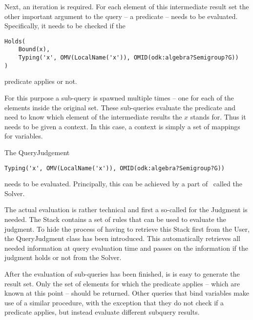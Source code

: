 Next, an iteration is required. 
For each element of this intermediate result set the other important argument to the query -- a predicate -- needs to be evaluated. 
Specifically, it needs to be checked if the \begin{lstlisting}[language=qmt]
Holds(
	Bound(x), 
	Typing('x', OMV(LocalName('x')), OMID(odk:algebra?Semigroup?G))
)
\end{lstlisting} predicate applies or not. 

For this purpose a sub-query is spawned multiple times -- one for each of the elements inside the original set. 
These sub-queries evaluate the predicate and need to know which element of the intermediate results the $x$ stands for. 
Thus it needs to be given a context. 
In this case, a context is simply a set of mappings for variables. 

The QueryJudgement \begin{lstlisting}[language=qmt]
Typing('x', OMV(LocalName('x')), OMID(odk:algebra?Semigroup?G))
\end{lstlisting}
needs to be evaluated. 
Principally, this can be achieved by a part of \mmt\ called the Solver. 

The actual evaluation is rather technical and first a so-called  for the Judgment is needed. 
The Stack contains a set of rules that can be used to evaluate the judgment. 
To hide the process of having to retrieve this Stack first from the User, the QueryJudgment class has been introduced. 
This automatically retrieves all needed information at query evaluation time and passes on the information if the judgment holds or not from the Solver. 

After the evaluation of sub-queries has been finished, is is easy to generate the result set. 
Only the set of elements for which the predicate applies -- which are known at this point -- should be returned. 
Other queries that bind variables make use of a similar procedure, with the exception that they do not check if a predicate applies, but instead evaluate different subquery results.